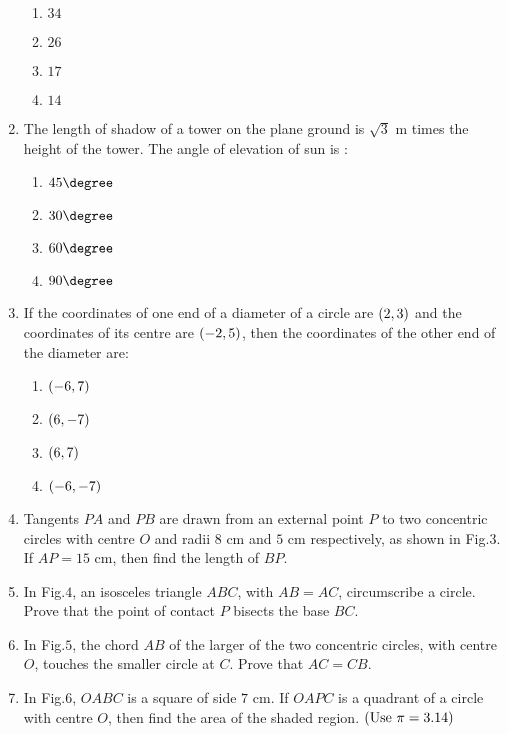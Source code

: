 \begin{enumerate}
\begin{enumerate}
\item $34$\\
\item $26$\\
\item $17$\\
\item $14$\\
\end{enumerate}
\item The length of shadow of a tower on the plane ground is $\sqrt 3 \text{ m}$ times the height of the tower. The angle of elevation of sun is :\\
\begin{enumerate}
\item $45\degree$\\
\item $30\degree$\\
\item $60\degree$\\
\item $90\degree$\\
\end{enumerate}
\item If the coordinates of one end of a diameter of a circle are $\left(2,3\right)$ and the coordinates of its centre are $\left(-2,5\right)$, then the coordinates of the other end of the diameter are:\\
\begin{enumerate}
\item $\left(-6,7\right)$\\
\item $\left(6,-7\right)$\\
\item $\left(6,7\right)$\\
\item $\left(-6,-7\right)$\\
\end{enumerate}
\item Tangents $PA$ and $PB$ are drawn from an external point $P$ to two concentric circles with centre $O$ and radii $8 \text{ cm}$ and $5 \text{ cm}$ respectively, as shown in Fig.$3$. If $AP = 15\text{ cm}$, then find the length of $BP$.\\
\item In Fig.$4$, an isosceles triangle $ABC$, with $AB = AC$, circumscribe a circle. Prove that the point of contact $P$ bisects the base $BC$.\\
\item In Fig.$5$, the chord $AB$ of the larger of the two concentric circles, with centre $O$, touches the smaller circle at $C$. Prove that $AC = CB$.\\
\item In Fig.$6$, $OABC$ is a square of side $7 \text{ cm}$. If $OAPC$ is a quadrant of a circle with centre $O$, then find the area of the shaded region. $\left(\text{Use } \pi = 3.14\right)$\\ 


\end{enumerate}
